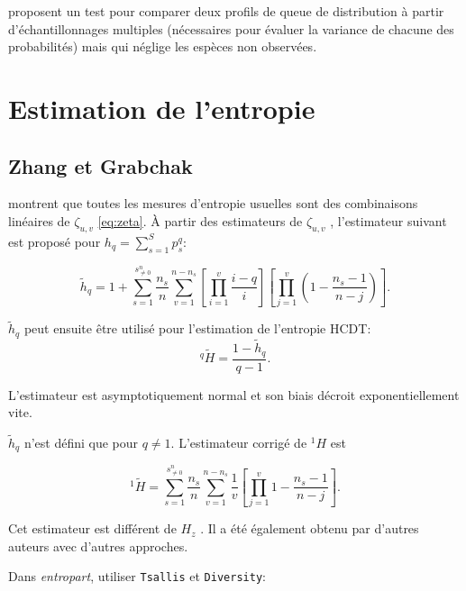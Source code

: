 \documentclass[
  11pt,
  french,
  a4paper,
  extrafontsizes,onecolumn,openright
  ]{memoir}
\begin{document}
\textcite{Fattorini1999} proposent un test pour comparer deux profils de queue de distribution à partir d'échantillonnages multiples (nécessaires pour évaluer la variance de chacune des probabilités) mais qui néglige les espèces non observées.

\section{Estimation de l'entropie}\label{estimation-de-lentropie}

\subsection{Zhang et Grabchak}\label{zhang-et-grabchak}

\textcite{Zhang2014} montrent que toutes les mesures d'entropie usuelles sont des combinaisons linéaires de \({\zeta}_{u,v}\) \eqref{eq:zeta}.
À partir des estimateurs de \({\zeta}_{u,v}\) \autocite{Zhang2010}, l'estimateur suivant est proposé pour \(h_q=\sum^S_{s=1}{p^q_s}\):

\begin{equation}
  \label{eq:Zhang2014hq}
  \tilde{h}_q = 1+\sum^{s^{n}_{\ne 0}}_{s=1}{\frac{n_s}{n}\sum^{n-n_s}_{v=1}{\left[\prod^v_{i=1}{\frac{i-q}{i}}\right]\left[\prod^v_{j=1}{\left(1-\frac{n_s-1}{n-j}\right)}\right]}}.
\end{equation}

\(\tilde{h}_q\) peut ensuite être utilisé pour l'estimation de l'entropie HCDT:
\begin{equation}
  \label{eq:HqZhang}
  ^q\!{\tilde{H}}
  = \frac{1-\tilde{h}_q}{q-1}.
\end{equation}

L'estimateur est asymptotiquement normal et son biais décroit exponentiellement vite.

\(\tilde{h}_q\) n'est défini que pour \(q\ne 1\).
L'estimateur corrigé de \(^{1}\!H\) est

\begin{equation}
  \label{eq:H1Zhang}
  ^1\!{\tilde{H}} =\sum^{s^{n}_{\ne 0}}_{s=1}{\frac{n_s}{n}\sum^{n-n_s}_{v=1}{\frac{1}{v}\left[\prod^v_{j=1}{1-\frac{n_s-1}{n-j}}\right]}}.
\end{equation}

Cet estimateur est différent de \(H_z\) \autocite{Zhang2012}.
Il a été également obtenu par d'autres auteurs \autocites{Mao2007,Vinck2012}[Annexe S1]{Chao2013} avec d'autres approches.

Dans \emph{entropart}, utiliser \texttt{Tsallis} et \texttt{Diversity}:
\end{document}
